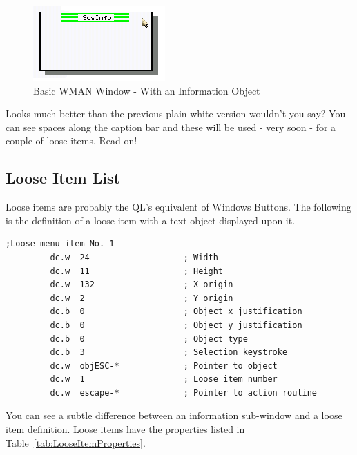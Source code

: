 \begin{figure}[h]
\center
\includegraphics{Content/images/SystemInfo_3.png}
\caption{Basic WMAN Window - With an Information Object}
\label{fig:FirstWindowInAction3}
\end{figure}


Looks much better than the previous plain white version wouldn't you say? You can
see spaces along the caption bar and these will be used -{} very soon -{} for a couple of
loose items. Read on!

\subsection{Loose Item List}
\label{ch23-loose-items}%

Loose items are probably the QL's equivalent of Windows Buttons. The following is
the definition of a loose item with a text object displayed upon it.

\begin{lstlisting}[firstnumber=last,caption={WMAN Example Window - Loose Item 0}]
;Loose menu item No. 1
         dc.w  24                   ; Width
         dc.w  11                   ; Height
         dc.w  132                  ; X origin
         dc.w  2                    ; Y origin
         dc.b  0                    ; Object x justification 
         dc.b  0                    ; Object y justification 
         dc.b  0                    ; Object type
         dc.b  3                    ; Selection keystroke
         dc.w  objESC-*             ; Pointer to object
         dc.w  1                    ; Loose item number
         dc.w  escape-*             ; Pointer to action routine
\end{lstlisting}

You can see a subtle difference between an information sub-{}window and a loose item
definition. Loose items have the properties listed in Table~\ref{tab:LooseItemProperties}.

